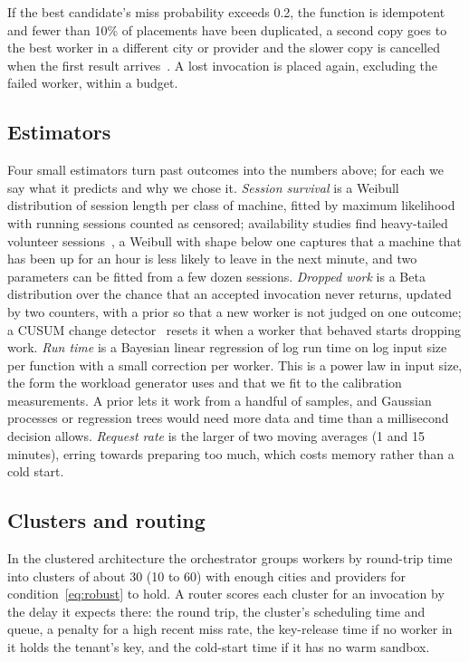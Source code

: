 If the best candidate's miss probability exceeds 0.2, the function is idempotent and fewer than 10\% of placements have been
duplicated, a second copy goes to the best worker in a different city or provider and the slower copy is cancelled when the
first result arrives~\cite{dean2013tail}. A lost invocation is placed again, excluding the failed worker, within a budget.

\subsection{Estimators}
Four small estimators turn past outcomes into the numbers above; for each we say what it predicts and why we chose it.
\emph{Session survival} is a Weibull distribution of session length per class of machine, fitted by maximum likelihood with
running sessions counted as censored; availability studies find heavy-tailed volunteer sessions~\cite{javadi2013fta}, a
Weibull with shape below one captures that a machine that has been up for an hour is less likely to leave in the next minute,
and two parameters can be fitted from a few dozen sessions. \emph{Dropped work} is a Beta distribution over the chance that an
accepted invocation never returns, updated by two counters, with a prior so that a new worker is not judged on one outcome;
a CUSUM change detector~\cite{page1954cusum} resets it when a worker that behaved starts dropping work.
\emph{Run time} is a Bayesian linear regression of log run time on log input size per function with a small correction per
worker. This is a power law in input size, the form the workload generator uses and that we fit to the calibration
measurements. A prior lets it work from a handful of samples, and Gaussian processes or regression trees would need more data and time than a millisecond decision allows. \emph{Request rate} is the larger
of two moving averages (1 and 15 minutes), erring towards preparing too much, which costs memory rather than a cold start.

\subsection{Clusters and routing}
In the clustered architecture the orchestrator groups workers by round-trip time into clusters of about 30 (10 to 60) with
enough cities and providers for condition~\eqref{eq:robust} to hold. A router scores each cluster for an invocation by the delay
it expects there: the round trip, the cluster's scheduling time and queue, a penalty for a high recent miss rate, the
key-release time if no worker in it holds the tenant's key, and the cold-start time if it has no warm sandbox.
